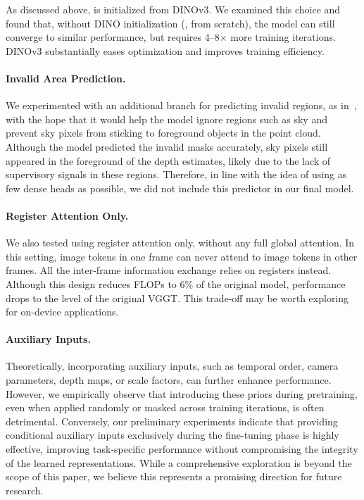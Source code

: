 As discussed above, \method is initialized from DINOv3.
We examined this choice and found that, without DINO initialization (\ie, from scratch), the model can still converge to similar performance, but requires 4--8$\times$ more training iterations.
DINOv3 substantially eases optimization and improves training efficiency.

\paragraph{Invalid Area Prediction.}

We experimented with an additional branch for predicting invalid regions, as in~\cite{wang24moge:, keetha26mapanything:}, with the hope that it would help the model ignore regions such as sky and prevent sky pixels from sticking to foreground objects in the point cloud.
Although the model predicted the invalid masks accurately, sky pixels still appeared in the foreground of the depth estimates, likely due to the lack of supervisory signals in these regions.
Therefore, in line with the idea of using as few dense heads as possible, we did not include this predictor in our final model.

\paragraph{Register Attention Only.}

We also tested using register attention only, without any full global attention.
In this setting, image tokens in one frame can never attend to image tokens in other frames.
All the inter-frame information exchange relies on registers instead.
Although this design reduces FLOPs to 6\% of the original model, performance drops to the level of the original VGGT\@.
This trade-off may be worth exploring for on-device applications.

\paragraph{Auxiliary Inputs.}

Theoretically, incorporating auxiliary inputs, such as temporal order, camera parameters, depth maps, or scale factors, can further enhance performance.
However, we empirically observe that introducing these priors during pretraining, even when applied randomly or masked across training iterations, is often detrimental.
Conversely, our preliminary experiments indicate that providing conditional auxiliary inputs exclusively during the fine-tuning phase is highly effective, improving task-specific performance without compromising the integrity of the learned representations.
While a comprehensive exploration is beyond the scope of this paper, we believe this represents a promising direction for future research.


